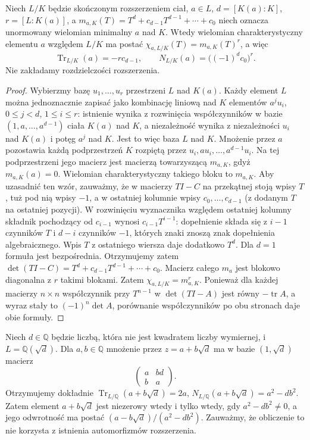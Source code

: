\begin{twierdzenie}
\label{aa:thm:trace-norm-minpoly}
Niech $L/K$ będzie skończonym rozszerzeniem ciał,
$a\in L$, $d=[K(a):K]$, $r=[L:K(a)]$, a
$m_{a,K}(T)=T^d+c_{d-1}T^{d-1}+\cdots+c_0$
niech oznacza unormowany wielomian minimalny $a$ nad $K$.
Wtedy wielomian charakterystyczny elementu $a$ względem $L/K$
ma postać $\chi_{a,L/K}(T)=m_{a,K}(T)^r$, a więc
\[
\operatorname{Tr}_{L/K}(a)=-r c_{d-1},\qquad
N_{L/K}(a)=\bigl((-1)^d c_0\bigr)^r.
\]
Nie zakładamy rozdzielczości rozszerzenia.
\end{twierdzenie}
\begin{proof}
Wybierzmy bazę $u_1,\ldots,u_r$ przestrzeni $L$ nad $K(a)$.
Każdy element $L$ można jednoznacznie zapisać jako
kombinację liniową nad $K$ elementów
$a^j u_i$, $0\le j<d$, $1\le i\le r$:
istnienie wynika z rozwinięcia współczynników
w bazie $(1,a,\ldots,a^{d-1})$ ciała $K(a)$ nad $K$,
a niezależność wynika z niezależności $u_i$ nad $K(a)$
i potęg $a^j$ nad $K$. Jest to więc baza $L$ nad $K$.
Mnożenie przez $a$ pozostawia każdą podprzestrzeń
$K$ rozpiętą przez $u_i,au_i,\ldots,a^{d-1}u_i$.
Na tej podprzestrzeni jego macierz jest macierzą
towarzyszącą $m_{a,K}$, gdyż $m_{a,K}(a)=0$.
Wielomian charakterystyczny takiego bloku to $m_{a,K}$.
Aby uzasadnić ten wzór, zauważmy, że w macierzy $TI-C$
na przekątnej stoją wpisy $T$, tuż pod nią wpisy $-1$,
a w ostatniej kolumnie wpisy $c_0,\ldots,c_{d-1}$
(z dodanym $T$ na ostatniej pozycji).
W rozwinięciu wyznacznika względem ostatniej kolumny
składnik pochodzący od $c_{i-1}$ wynosi
$c_{i-1}T^{i-1}$: dopełnienie składa się z $i-1$
czynników $T$ i $d-i$ czynników $-1$, których znaki
znoszą znak dopełnienia algebraicznego.
Wpis $T$ z ostatniego wiersza daje dodatkowo $T^d$.
Dla $d=1$ formuła jest bezpośrednia.
Otrzymujemy zatem $\det(TI-C)=T^d+c_{d-1}T^{d-1}+\cdots+c_0$.
Macierz całego $m_a$ jest blokowo diagonalna
z $r$ takimi blokami. Zatem $\chi_{a,L/K}=m_{a,K}^r$.
Ponieważ dla każdej macierzy $n\times n$ współczynnik
przy $T^{n-1}$ w $\det(TI-A)$ jest równy
$-\operatorname{tr}A$, a wyraz stały to
$(-1)^n\det A$, porównanie współczynników
po obu stronach daje obie formuły.
\end{proof}

\begin{przyklad}
\label{aa:prz:trace-norm-quadratic}
\label{aa:ex:quadratic-norm}
Niech $d\in\mathbb Q$ będzie liczbą, która nie jest kwadratem
liczby wymiernej, i $L=\mathbb Q(\sqrt d)$.
Dla $a,b\in\mathbb Q$ mnożenie przez $z=a+b\sqrt d$
ma w bazie $(1,\sqrt d)$ macierz
\[
\begin{pmatrix}a&bd\\ b&a\end{pmatrix}.
\]
Otrzymujemy dokładnie
$\operatorname{Tr}_{L/\mathbb Q}(a+b\sqrt d)=2a$,
$N_{L/\mathbb Q}(a+b\sqrt d)=a^2-db^2$.
Zatem element $a+b\sqrt d$ jest niezerowy wtedy i tylko wtedy,
gdy $a^2-db^2\ne0$, a jego odwrotność ma postać
$(a-b\sqrt d)/(a^2-db^2)$. Zauważmy, że obliczenie to
nie korzysta z istnienia automorfizmów rozszerzenia.
\end{przyklad}


